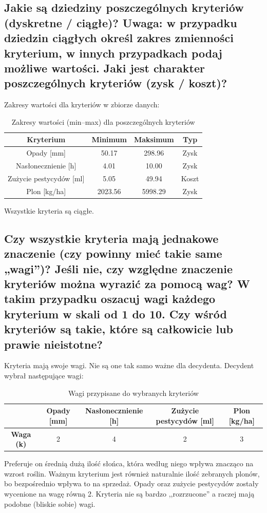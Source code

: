 \documentclass[11pt]{article}
\begin{document}
\subsection{Jakie są dziedziny poszczególnych kryteriów (dyskretne / ciągłe)? Uwaga: w przypadku dziedzin ciągłych określ zakres zmienności kryterium, w innych przypadkach podaj możliwe wartości. Jaki jest charakter poszczególnych kryteriów (zysk / koszt)?}
Zakresy wartości dla kryteriów w zbiorze danych:
\begin{table}[H]
\centering
\begin{tabular}{|c||c|c|c|}
\hline
\textbf{Kryterium} & \textbf{Minimum} & \textbf{Maksimum} & \textbf{Typ} \\
\hline
Opady [mm] & 50.17 & 298.96 & Zysk \\ \hline
Nasłonecznienie [h] & 4.01 & 10.00 & Zysk \\ \hline
Zużycie pestycydów [ml] & 5.05 & 49.94 & Koszt \\ \hline
Plon [kg/ha] & 2023.56 & 5998.29 & Zysk \\
\hline
\end{tabular}
\caption{Zakresy wartości (min–max) dla poszczególnych kryteriów}
\end{table}
Wszystkie kryteria są ciągłe.

\subsection{Czy wszystkie kryteria mają jednakowe znaczenie (czy powinny mieć takie same „wagi”)? Jeśli nie, czy względne znaczenie kryteriów można wyrazić za pomocą wag? W takim przypadku oszacuj wagi każdego kryterium w skali od 1 do 10. Czy wśród kryteriów są takie, które są całkowicie lub prawie nieistotne?}
Kryteria mają swoje wagi. Nie są one tak samo ważne dla decydenta. Decydent wybrał następujące wagi:
\begin{table}[H]
\centering
\begin{tabular}{|c||c|c|c|c|}
\hline
 & \textbf{Opady [mm]} & \textbf{Nasłonecznienie [h]} & \textbf{Zużycie pestycydów [ml]} & \textbf{Plon [kg/ha]} \\
\hline
\textbf{Waga (k)} & 2 & 4 & 2 & 3 \\
\hline
\end{tabular}
\caption{Wagi przypisane do wybranych kryteriów}
\end{table}
Preferuje on średnią dużą ilość słońca, która według niego wpływa znacząco na wzrost roślin. Ważnym kryterium jest również naturalnie ilość zebranych plonów, bo bezpośrednio wpływa to na sprzedaż. Opady oraz zużycie pestycydów zostały wycenione na wagę równą 2. Kryteria nie są bardzo ,,rozrzucone'' a raczej mają podobne (bliskie sobie) wagi. 
\end{document}
